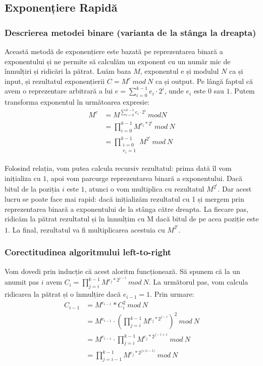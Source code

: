\documentclass[12]{report}
\begin{document}
     \subsection{Exponențiere Rapidă}
      \subsubsection{Descrierea metodei binare (varianta de la stânga la dreapta)}
       Această metodă de exponențiere este bazată pe reprezentarea binară a exponentului și ne permite să calculăm un exponent cu un număr mic de înmulțiri și ridicări la pătrat. Luăm baza $M$, exponentul e și modulul $N$ ca și input, și rezultatul exponențierii $C = M^e \ mod \ N$ ca și output. Pe lângă faptul că avem o reprezentare arbitrară a lui $ e = \sum_{i=0} ^ {k-1} e_i \cdot   2^i $, unde $ e_i $ este $0$ sau $1$. Putem transforma exponentul în următoarea expresie: \\
       \begin{align*}
        M^e &= M^{\sum_{i=0} ^ {k-1} e_i \cdot   2^i} \ mod N \\ 
        &=  \prod_{i=0}^{k-1} M^{e_i*2^i} \ mod \ N \\
        &= \prod_{\substack{i=0 \\ e_i =1}}^{k-1} M^{2^i} \ mod \ N 
       \end{align*}
        
       Folosind relația, vom putea calcula recursiv rezultatul: prima dată îl vom inițializa cu $1$, apoi vom parcurge reprezentarea binară a exponentului. Dacă bitul de la poziția $i$ este $1$, atunci o vom multiplica cu rezultatul $ M^{2^i}$. Dar acest lucru se poate face mai rapid: dacă inițializăm rezultatul cu 1 și mergem prin reprezentarea binară a exponentului de la stânga către dreapta. La fiecare pas, ridicăm la pătrat rezultatul și în înmulțim cu M dacă bitul de pe acea poziție este $1$. La final, rezultatul va fi multiplicarea acestuia cu $ M^{2^i}$.
      \subsubsection{Corectitudinea algoritmului left-to-right}
      Vom dovedi prin inducție că acest aloritm funcționează. Să spunem că la un anumit pas $i$ avem $ C_i = \prod_{j=i}^{k-1} {M^{e_j*2^{j-i}}} \ mod \ N$. La următorul pas, vom calcula ridicarea la pătrat și o înmulțire dacă $ e_{i-1} = 1 $. Prin urmare: \\
      \begin{align*}
       C_{i-1} &= M^{e_{i-1}}*C_{i}^2 \ mod \ N\\
       &= M^{e_{i-1}} \cdot   \left( \prod_{j=i}^{k-1} M^{e_j*2^{j-i}} \right)^2 \ mod \ N \\ 
       &= M^{e_{i-1}} \cdot   \prod_{j=i}^{k-1} M^{e_j*2^{j-i+1}} \ mod \ N \\
       &= \prod_{j=i-1}^{k-1} M^{e_j*2^{j+)i-1)}} \ mod \ N 
      \end{align*}
      
\end{document}

